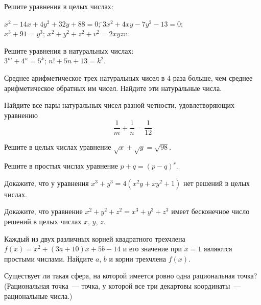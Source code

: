 %
%


\begin{problems}
\item
Решите уравнения в целых числах:
\begin{tabbing}
\sbp $x^2 - 14 x + 4 y^2 + 32 y + 88 = 0$;
\qquad\=
\sbp $3 x^2 + 4 x y - 7 y^2 - 13 = 0$;
\\
\sbp $x^3 + 91 = y^3$;
\qquad\>
\sbp $x^2 + y^2 + z^2 + v^2 = 2 x y z v$.
\end{tabbing}

\item
Решите уравнения в натуральных числах:
\\
\sbp $3^m + 4^n = 5^k$;
\qquad
\sbp $n! + 5 n + 13 = k^2$.

\item
Среднее арифметическое трех натуральных чисел в $4$ раза больше, чем среднее
арифметическое обратных им чисел.
Найдите эти натуральные числа.

\item
Найдите все пары натуральных чисел разной четности, удовлетворяющих уравнению
\[
    \frac{1}{m} + \frac{1}{n} = \frac{1}{12}
\]

\item
Решите в целых числах уравнение $\sqrt{x} + \sqrt{y} = \sqrt{98}$.

\item
Решите в простых числах уравнение $p + q = (p - q)^r$.

\item
Докажите, что у уравнения
$x^3 + y^3 = 4 (x^2 y + x y^2 + 1)$
нет решений в целых числах.

\item
Докажите, что уравнение $x^2 + y^2 + z^2 = x^3 + y^3 + z^3$ имеет бесконечное
число решений в целых числах $x$, $y$, $z$.

\item
Каждый из двух различных корней квадратного трехчлена
$f(x) = x^2 + (3 a + 10) x + 5 b - 14$
и его значение при $x = 1$ являются простыми числами.
Найдите $a$, $b$ и корни трехчлена $f(x)$.

\item
Существует ли такая сфера, на которой имеется ровно одна рациональная точка?
(Рациональная точка~--- точка, у которой все три декартовы координаты~---
рациональные числа.)

\end{problems}

